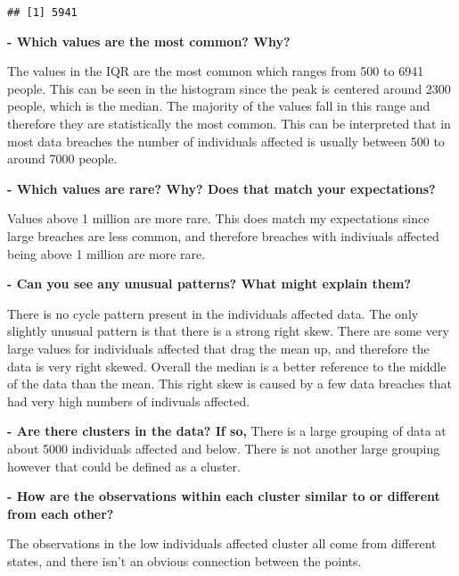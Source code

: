 \documentclass[
]{article}
\newenvironment{Shaded}{\begin{snugshade}}{\end{snugshade}}
\newcommand{\AttributeTok}[1]{\textcolor[rgb]{0.77,0.63,0.00}{#1}}
\newcommand{\ConstantTok}[1]{\textcolor[rgb]{0.00,0.00,0.00}{#1}}
\newcommand{\FunctionTok}[1]{\textcolor[rgb]{0.00,0.00,0.00}{#1}}
\newcommand{\NormalTok}[1]{#1}
\newcommand{\SpecialCharTok}[1]{\textcolor[rgb]{0.00,0.00,0.00}{#1}}
\begin{document}
\begin{Shaded}
\end{Shaded}

\begin{verbatim}
## [1] 5941
\end{verbatim}

\textbf{- Which values are the most common? Why?}

The values in the IQR are the most common which ranges from 500 to 6941
people. This can be seen in the histogram since the peak is centered
around 2300 people, which is the median. The majority of the values fall
in this range and therefore they are statistically the most common. This
can be interpreted that in most data breaches the number of individuals
affected is usually between 500 to around 7000 people.

\textbf{- Which values are rare? Why? Does that match your
expectations?}

Values above 1 million are more rare. This does match my expectations
since large breaches are less common, and therefore breaches with
indiviuals affected being above 1 million are more rare.

\textbf{- Can you see any unusual patterns? What might explain them?}

There is no cycle pattern present in the individuals affected data. The
only slightly unusual pattern is that there is a strong right skew.
There are some very large values for individuals affected that drag the
mean up, and therefore the data is very right skewed. Overall the median
is a better reference to the middle of the data than the mean. This
right skew is caused by a few data breaches that had very high numbers
of indivuals affected.

\textbf{- Are there clusters in the data? If so,} There is a large
grouping of data at about 5000 individuals affected and below. There is
not another large grouping however that could be defined as a cluster.

\textbf{- How are the observations within each cluster similar to or
different from each other?}

The observations in the low individuals affected cluster all come from
different states, and there isn't an obvious connection between the
points.
\end{document}
